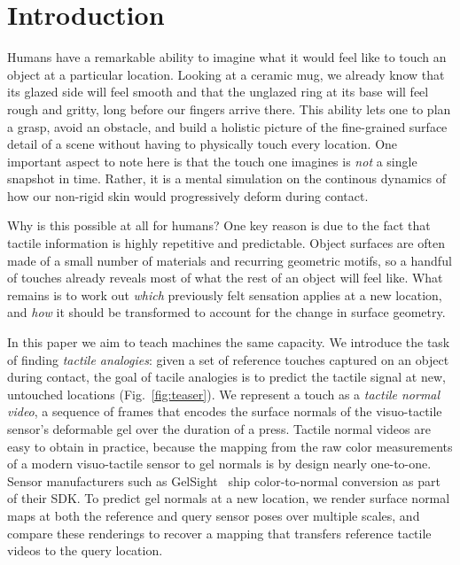 \section{Introduction}
\label{sec:intro}



Humans have a remarkable ability to imagine what it would feel like to touch an object at a
particular location. Looking at a ceramic mug, we already know that its glazed side will feel
smooth and that the unglazed ring at its base will feel rough and gritty, long before our fingers
arrive there. This ability lets one to plan a grasp, avoid an obstacle, and build a holistic picture of the
fine-grained surface detail of a scene without having to physically touch every location.
One important aspect to note here is that the touch one imagines is \textit{not} a single snapshot in time.
Rather, it is a mental simulation on the continous dynamics of how our non-rigid skin would progressively deform during contact.

Why is this possible at all for humans? 
One key reason is due to the fact that tactile information is highly repetitive and predictable. 
Object surfaces are often made of a small number of materials and recurring geometric motifs,
so a handful of touches already reveals most of what the rest of an object will feel like. 
What remains is to work out \emph{which} previously felt sensation applies at a new
location, and \emph{how} it should be transformed to account for the change in surface geometry.

In this paper we aim to teach machines the same capacity. We introduce the task of finding
\emph{tactile analogies}: given a set of reference touches captured on an object during contact,
the goal of tacile analogies is to predict the tactile signal at new, untouched locations (Fig.~\ref{fig:teaser}).
We represent a touch as a \emph{tactile normal video}, a sequence of frames that encodes the surface normals of
the visuo-tactile sensor's deformable gel over the duration of a press. 
Tactile normal videos are easy to obtain in practice, because the mapping from the raw color measurements of a modern visuo-tactile 
sensor to gel normals is by design nearly one-to-one. Sensor manufacturers such as
GelSight~\cite{gelsight} ship color-to-normal conversion as part of their SDK. To
predict gel normals at a new location, we render surface normal maps at both the reference and
query sensor poses over multiple scales, and compare these renderings to recover a
mapping that transfers reference tactile videos to the query location.


